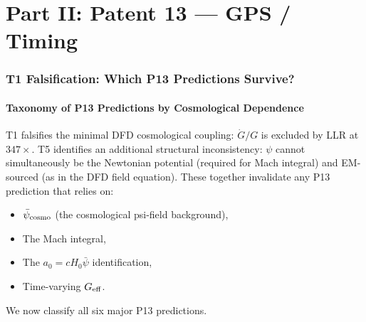 \documentclass[aps,prd,twocolumn,superscriptaddress,nofootinbib]{revtex4-2}
\begin{document}
\part*{Part II: Patent 13 --- GPS / Timing}

\section{T1 Falsification: Which P13 Predictions Survive?}
\label{sec:T1_survival}

\subsection{Taxonomy of P13 Predictions by Cosmological Dependence}

T1 falsifies the minimal DFD cosmological coupling: $\dot{G}/G$ is
excluded by LLR at $347\times$. T5 identifies an additional structural
inconsistency: $\psi$ cannot simultaneously be the Newtonian potential
(required for Mach integral) and EM-sourced (as in the DFD field
equation). These together invalidate any P13 prediction that relies on:
\begin{itemize}
\item $\bar{\psi}_{\rm cosmo}$ (the cosmological psi-field background),
\item The Mach integral,
\item The $a_0 = cH_0\bar{\psi}$ identification,
\item Time-varying $G_{\rm eff}$.
\end{itemize}

We now classify all six major P13 predictions.
\end{document}
